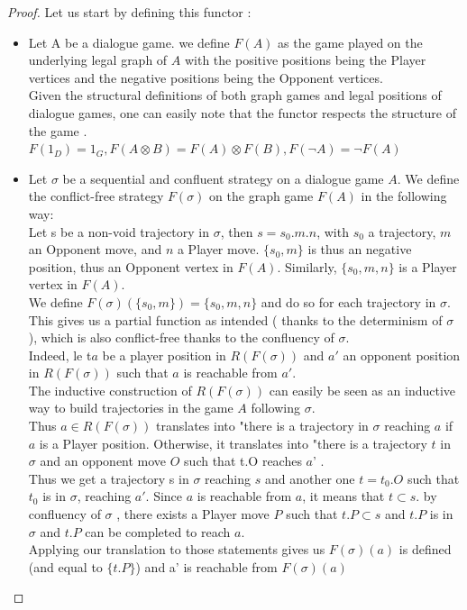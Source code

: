 \documentclass[a4paper,UKenglish]{lipics}
\begin{document}
\begin{proof}
Let us start by defining this functor :
\begin{itemize}
\item Let A be a dialogue game. we define $F(A)$ as the game played on the underlying legal graph of $A$ with the positive positions being the Player vertices and the negative positions being the Opponent vertices. \\Given the structural definitions of both graph games and legal positions of dialogue games, one can easily note that the functor respects the structure of the game . $F(1_{D})=1_{G}, F(A \otimes B) = F(A) \otimes F(B), F(\neg A) = \neg F(A)$\\

\item  Let $\sigma$ be a sequential and confluent strategy on a dialogue game $A$. We define the conflict-free strategy $F(\sigma)$ on the graph game $F(A)$ in the following way:\\ 
Let s be a non-void trajectory in $\sigma$, then $s=s_0.m.n$, with $s_0$ a trajectory, $m$ an Opponent move, and $n$ a Player move. $\{ s_0,m\}$ is thus an negative position, thus an Opponent vertex in $F(A)$. Similarly, $\{s_0,m,n\}$ is a Player vertex in $F(A)$.\\ We define $F(\sigma)(\{ s_0,m\}) = \{s_0,m,n\}$ and do so for each trajectory in $\sigma$. This gives us a partial function as intended ( thanks to the determinism of $\sigma$), which is also conflict-free thanks to the confluency of $\sigma$.\\
 Indeed,  le t$a$ be a player position in $R(F(\sigma))$ and $a'$ an opponent position in $R(F(\sigma))$ such that $a$ is reachable from $a'$.\\ The inductive construction of $R(F(\sigma))$ can easily be seen as an inductive way to build trajectories in the game $A$ following $\sigma$.\\
 Thus $a\in R(F(\sigma))$  translates into "there is a trajectory in $\sigma$ reaching $a$ if $a$ is a Player position. Otherwise, it translates into "there is a trajectory $t$ in $\sigma$ and an opponent move $O$ such that t.O reaches $a$' .\\
Thus we get a trajectory s in $\sigma$  reaching $s$ and another one $t=t_0.O$ such that $t_0$ is in $\sigma$,  reaching $a'$. Since $a$ is reachable from $a$, it means that $t \subset s$. by confluency of $\sigma$ , there exists  a Player move $P$ such that $t.P\subset s$ and $t.P$ is in $\sigma$ and $t.P$ can be completed to reach $a$.\\ 
Applying our translation to those statements gives us $F(\sigma) (a)$ is defined (and equal to $\{t.P\}$) and a' is reachable from $F(\sigma) (a)$ \\


\end{itemize}
\end{proof}
\end{document}
